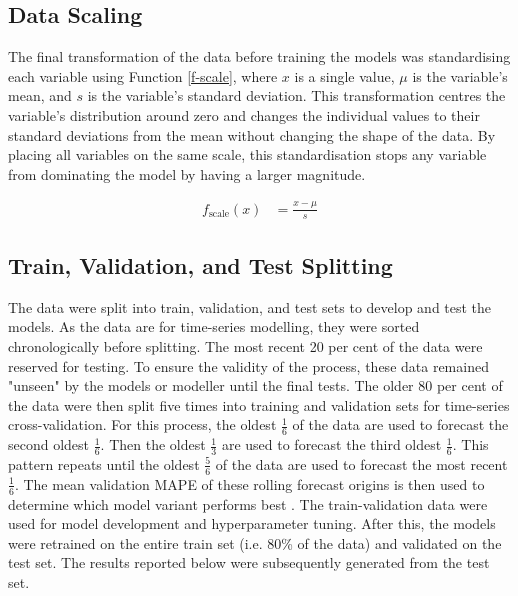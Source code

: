 \documentclass[mstat,12pt]{unswthesis}
\begin{document}
\hypertarget{data-scaling}{%
\subsection{Data Scaling}\label{data-scaling}}

The final transformation of the data before training the models was standardising each variable using Function \ref{f-scale}, where $x$ is a single value, $\mu$ is the variable's mean, and $s$ is the variable's standard deviation. This transformation centres the variable's distribution around zero and changes the individual values to their standard deviations from the mean without changing the shape of the data. By placing all variables on the same scale, this standardisation stops any variable from dominating the model by having a larger magnitude.

\begin{align}\label{f-scale}
f_{\text{scale}}(x) &= \frac{x-\mu}s
\end{align}

\hypertarget{train-val-test}{%
\subsection{Train, Validation, and Test Splitting}\label{train-val-test}}

The data were split into train, validation, and test sets to develop and test the models. As the data are for time-series modelling, they were sorted chronologically before splitting. The most recent 20 per cent of the data were reserved for testing. To ensure the validity of the process, these data remained "unseen" by the models or modeller until the final tests. The older 80 per cent of the data were then split five times into training and validation sets for time-series cross-validation. For this process, the oldest $\frac16$ of the data are used to forecast the second oldest $\frac16$. Then the oldest $\frac1{3}$ are used to forecast the third oldest $\frac16$. This pattern repeats until the oldest $\frac56$ of the data are used to forecast the most recent $\frac16$. The mean validation MAPE of these rolling forecast origins is then used to determine which model variant performs best \cite{hyndman2018}. The train-validation data were used for model development and hyperparameter tuning. After this, the models were retrained on the entire train set (i.e. 80\% of the data) and validated on the test set. The results reported below were subsequently generated from the test set.
\end{document}

